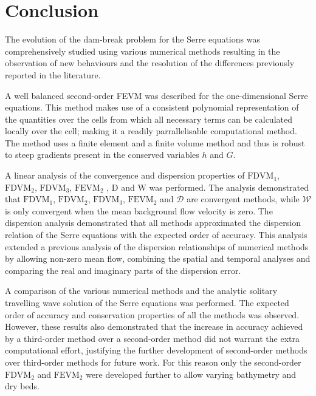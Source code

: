 
\chapter{Conclusion}
\label{chp:Conclusion}



The evolution of the dam-break problem for the Serre equations was comprehensively studied using various numerical methods resulting in the observation of new behaviours and the resolution of the differences previously reported in the literature.  

A well balanced second-order FEVM was described for the one-dimensional Serre equations. This method makes use of a consistent polynomial representation of the quantities over the cells from which all necessary terms can be calculated locally over the cell; making it a readily parrallelisable computational method. The method uses a finite element and a finite volume method and thus is robust to steep gradients present in the conserved variables $h$ and $G$. 

A linear analysis of the convergence and dispersion properties of $\text{FDVM}_1$, $\text{FDVM}_2$, $\text{FDVM}_3$, $\text{FEVM}_2$ , $\text{D}$ and $\text{W}$ was performed. The analysis demonstrated that $\text{FDVM}_1$, $\text{FDVM}_2$, $\text{FDVM}_3$, $\text{FEVM}_2$ and $\mathcal{D}$ are convergent methods, while $\mathcal{W}$ is only convergent when the mean background flow velocity is zero. The dispersion analysis demonstrated that all methods approximated the dispersion relation of the Serre equations with the expected order of accuracy. This analysis extended a previous analysis of the dispersion relationships of numerical methods \cite{Filippini-etal-2016-381} by allowing non-zero mean flow, combining the spatial and temporal analyses and comparing the real and imaginary parts of the dispersion error. 

A comparison of the various numerical methods and the analytic solitary travelling wave solution of the Serre equations was performed. The expected order of accuracy and conservation properties of all the methods was observed. However, these results also demonstrated that the increase in accuracy achieved by a third-order method over a second-order method did not warrant the extra computational effort, justifying the further development of second-order methods over third-order methods for future work. For this reason only the second-order $\text{FDVM}_2$ and $\text{FEVM}_2$ were developed further to allow varying bathymetry and dry beds.

